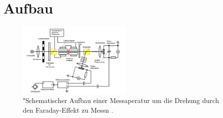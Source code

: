 \section{Aufbau}

\begin{figure}
    \centering
    \includegraphics[width=0.5\textwidth]{bilder/Aufbau.png}
    \caption{"Schematischer Aufbau einer Messaperatur um die Drehung durch den Faraday-Effekt zu Messn \cite{skript}.}
    \label{fig:aufbau}
\end{figure}

